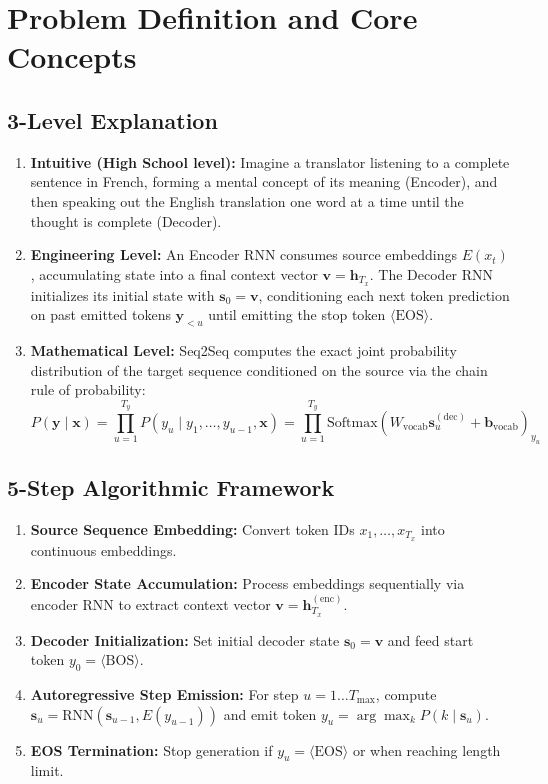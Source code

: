 \documentclass[11pt,a4paper]{article}
\theoremstyle{definition}
\begin{document}
\section{Problem Definition and Core Concepts}

\subsection{3-Level Explanation}
\begin{enumerate}
    \item \textbf{Intuitive (High School level):} Imagine a translator listening to a complete sentence in French, forming a mental concept of its meaning (Encoder), and then speaking out the English translation one word at a time until the thought is complete (Decoder).
    \item \textbf{Engineering Level:} An Encoder RNN consumes source embeddings $E(x_t)$, accumulating state into a final context vector $\mathbf{v} = \mathbf{h}_{T_x}$. The Decoder RNN initializes its initial state with $\mathbf{s}_0 = \mathbf{v}$, conditioning each next token prediction on past emitted tokens $\mathbf{y}_{<u}$ until emitting the stop token $\langle \text{EOS} \rangle$.
    \item \textbf{Mathematical Level:} Seq2Seq computes the exact joint probability distribution of the target sequence conditioned on the source via the chain rule of probability:
    \begin{equation}
    P(\mathbf{y} \mid \mathbf{x}) = \prod_{u=1}^{T_y} P(y_u \mid y_1, \dots, y_{u-1}, \mathbf{x}) = \prod_{u=1}^{T_y} \text{Softmax}\left( W_{\text{vocab}} \mathbf{s}_u^{(\text{dec})} + \mathbf{b}_{\text{vocab}} \right)_{y_u}
    \end{equation}
\end{enumerate}

\subsection{5-Step Algorithmic Framework}
\begin{enumerate}
    \item \textbf{Source Sequence Embedding:} Convert token IDs $x_1, \dots, x_{T_x}$ into continuous embeddings.
    \item \textbf{Encoder State Accumulation:} Process embeddings sequentially via encoder RNN to extract context vector $\mathbf{v} = \mathbf{h}_{T_x}^{(\text{enc})}$.
    \item \textbf{Decoder Initialization:} Set initial decoder state $\mathbf{s}_0 = \mathbf{v}$ and feed start token $y_0 = \langle \text{BOS} \rangle$.
    \item \textbf{Autoregressive Step Emission:} For step $u = 1 \dots T_{\max}$, compute $\mathbf{s}_u = \text{RNN}(\mathbf{s}_{u-1}, E(y_{u-1}))$ and emit token $y_u = \arg\max_k P(k \mid \mathbf{s}_u)$.
    \item \textbf{EOS Termination:} Stop generation if $y_u = \langle \text{EOS} \rangle$ or when reaching length limit.
\end{enumerate}
\end{document}
